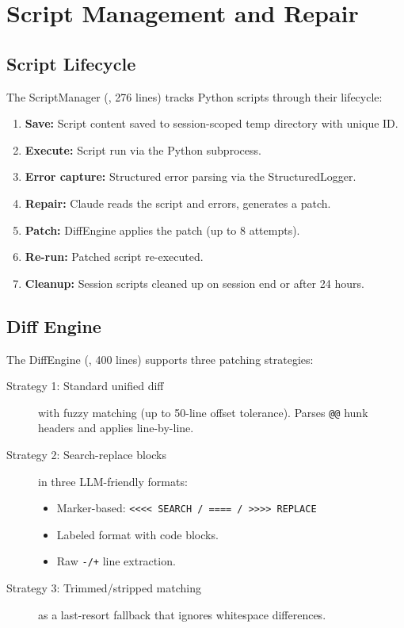 \section{Script Management and Repair}
\label{sec:modeling:repair}

\subsection{Script Lifecycle}

The ScriptManager (, 276 lines) tracks Python scripts through their lifecycle:

\begin{enumerate}
  \item \textbf{Save:} Script content saved to session-scoped temp directory with unique ID.
  \item \textbf{Execute:} Script run via the Python subprocess.
  \item \textbf{Error capture:} Structured error parsing via the StructuredLogger.
  \item \textbf{Repair:} Claude reads the script and errors, generates a patch.
  \item \textbf{Patch:} DiffEngine applies the patch (up to 8 attempts).
  \item \textbf{Re-run:} Patched script re-executed.
  \item \textbf{Cleanup:} Session scripts cleaned up on session end or after 24 hours.
\end{enumerate}

\subsection{Diff Engine}

The DiffEngine (, 400 lines) supports three patching strategies:

\begin{description}
  \item[Strategy 1: Standard unified diff] with fuzzy matching (up to 50-line offset tolerance). Parses \texttt{@@} hunk headers and applies line-by-line.
  \item[Strategy 2: Search-replace blocks] in three LLM-friendly formats:
  \begin{itemize}
    \item Marker-based: \texttt{<<<< SEARCH / ==== / >>>> REPLACE}
    \item Labeled format with code blocks.
    \item Raw \texttt{-/+} line extraction.
  \end{itemize}
  \item[Strategy 3: Trimmed/stripped matching] as a last-resort fallback that ignores whitespace differences.
\end{description}

